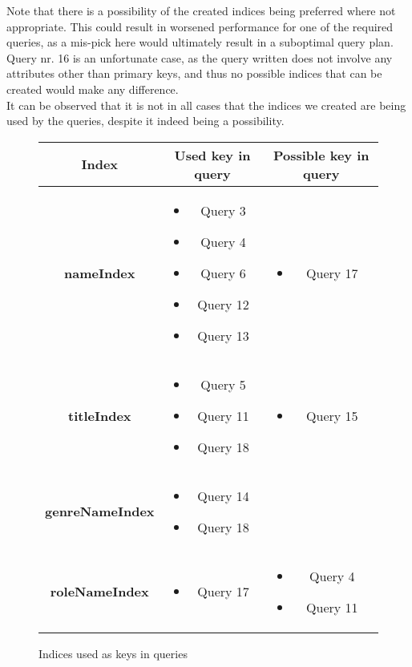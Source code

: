 Note that there is a possibility of the created indices being preferred where not appropriate. This could result in worsened performance for one of the required queries, as a mis-pick here would ultimately result in a suboptimal query plan.\\

Query nr. 16 is an unfortunate case, as the query written does not involve any attributes other than primary keys, and thus no possible indices that can be created would make any difference.\\

It can be observed that it is not in all cases that the indices we created are being used by the queries, despite it indeed being a possibility.

\begin{figure}[ht]
	\centering
	\begin{tabular}{c|c|c}
		\textbf{Index} & \textbf{Used key in query} & \textbf{Possible key in query}\\
		\hline
		\textbf{nameIndex}
		&
			\parbox{3cm}{
				\begin{itemize}
					\item Query 3
					\item Query 4
					\item Query 6
					\item Query 12
					\item Query 13
				\end{itemize}
			}
		&
			\parbox{3cm}{
				\begin{itemize}
					\item Query 17
				\end{itemize}
			}
		\\\hline
		\textbf{titleIndex}
		&
			\parbox{3cm}{
				\begin{itemize}
					\item Query 5
					\item Query 11
					\item Query 18
				\end{itemize}
			}
		&
			\parbox{3cm}{
				\begin{itemize}
					\item Query 15
				\end{itemize}
			}
		\\\hline
		\textbf{genreNameIndex}
		&
			\parbox{3cm}{
				\begin{itemize}
					\item Query 14
					\item Query 18
				\end{itemize}
			}
		&
		\\\hline
		\textbf{roleNameIndex}
		&
			\parbox{3cm}{
				\begin{itemize}
					\item Query 17
				\end{itemize}
			}
		&
			\parbox{3cm}{
				\begin{itemize}
					\item Query 4
					\item Query 11
				\end{itemize}
			}
	\end{tabular}
	\caption{Indices used as keys in queries}
\end{figure}